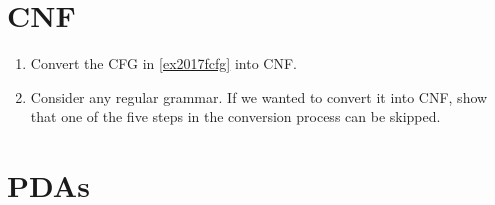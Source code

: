 \section{CNF}

\begin{enumerate}[resume]

\item {} Convert the CFG in \cref{ex2017fcfg} into CNF.

\item {} Consider any regular grammar. If we wanted to convert it into CNF, show that one of the five steps in the conversion process can be skipped.

\end{enumerate}

\section{PDAs}

